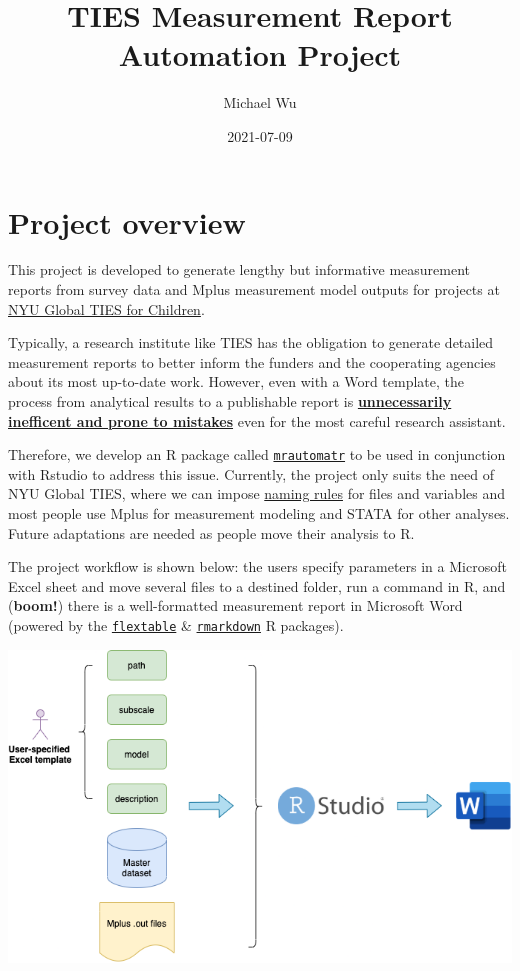\documentclass[
]{book}
\title{TIES Measurement Report Automation Project}
\author{Michael Wu}
\date{2021-07-09}
\begin{document}
\maketitle

{
\setcounter{tocdepth}{1}
\tableofcontents
}
\hypertarget{project-overview}{%
\chapter{Project overview}\label{project-overview}}

This project is developed to generate lengthy but informative measurement reports from survey data and Mplus measurement model outputs for projects at \href{https://steinhardt.nyu.edu/ihdsc/global-ties}{NYU Global TIES for Children}.

Typically, a research institute like TIES has the obligation to generate detailed measurement reports to better inform the funders and the cooperating agencies about its most up-to-date work. However, even with a Word template, the process from analytical results to a publishable report is \underline{\textbf{unnecessarily inefficent and prone to mistakes}} even for the most careful research assistant.

Therefore, we develop an R package called \href{https://github.com/nyuglobalties/mrautomatr}{\texttt{mrautomatr}} to be used in conjunction with Rstudio to address this issue. Currently, the project only suits the need of NYU Global TIES, where we can impose \href{https://nyu.box.com/s/ate5l7wmw164u7xjg3g8x1vrfhwnt0ax}{naming rules} for files and variables and most people use Mplus for measurement modeling and STATA for other analyses. Future adaptations are needed as people move their analysis to R.

The project workflow is shown below: the users specify parameters in a Microsoft Excel sheet and move several files to a destined folder, run a command in R, and (\textbf{boom!}) there is a well-formatted measurement report in Microsoft Word (powered by the \href{https://davidgohel.github.io/flextable/}{\texttt{flextable}} \& \href{https://bookdown.org/yihui/rmarkdown/}{\texttt{rmarkdown}} R packages).

\begin{center}\includegraphics[width=0.66\linewidth]{images/mrautomatr_diagram} \end{center}
\end{document}
